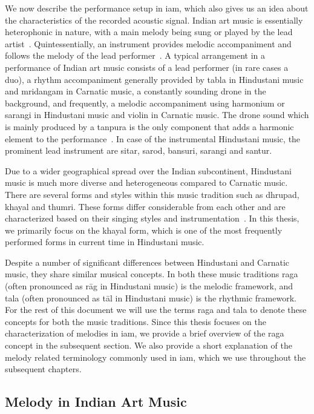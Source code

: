 We now describe the performance setup in \gls{iam}, which also gives us an idea about the characteristics of the recorded acoustic signal. Indian art music is essentially heterophonic in nature, with a main melody being sung or played by the lead artist~\citep{Bagchee1998}. Quintessentially, an instrument provides melodic accompaniment and follows the melody of the lead performer~\citep{Viswanathan2004}. A typical arrangement in a performance of Indian art music consists of a lead performer (in rare cases a duo), a rhythm accompaniment generally provided by \gls{tabla} in Hindustani music and \gls{mridangam} in Carnatic music, a constantly sounding drone in the background, and frequently, a melodic accompaniment using harmonium or \gls{sarangi} in Hindustani music and violin in Carnatic music. The drone sound which is mainly produced by a \gls{tanpura} is the only component that adds a harmonic element to the performance~\citep{Bagchee1998}. In case of the instrumental Hindustani music, the prominent lead instrument are \gls{sitar}, \gls{sarod}, \gls{bansuri}, \gls{sarangi} and \gls{santur}.

Due to a wider geographical spread over the Indian subcontinent, Hindustani music is much more diverse and heterogeneous compared to Carnatic music. There are several forms and styles within this music tradition such as \gls{dhrupad}, \gls{khayal} and \gls{thumri}. These forms differ considerable from each other and are characterized based on their singing styles and instrumentation~\citep{Bor2010}. In this thesis, we primarily focus on the \gls{khayal} form, which is one of the most frequently performed forms in current time in Hindustani music. 

Despite a number of significant differences between Hindustani and Carnatic music, they share similar musical concepts. In both these music traditions \gls{raga} (often pronounced as r\={a}g in Hindustani music) is the melodic framework, and \gls{tala} (often pronounced as t\={a}l in Hindustani music) is the rhythmic framework. For the rest of this document we will use the terms \gls{raga} and \gls{tala} to denote these concepts for both the music traditions. Since this thesis focuses on the characterization of melodies in \gls{iam}, we provide a brief overview of the \gls{raga} concept in the subsequent section. We also provide a short explanation of the melody related terminology commonly used in \gls{iam}, which we use throughout the subsequent chapters. 


\subsection{Melody in Indian Art Music}
\label{sec:melody_in_iam}

